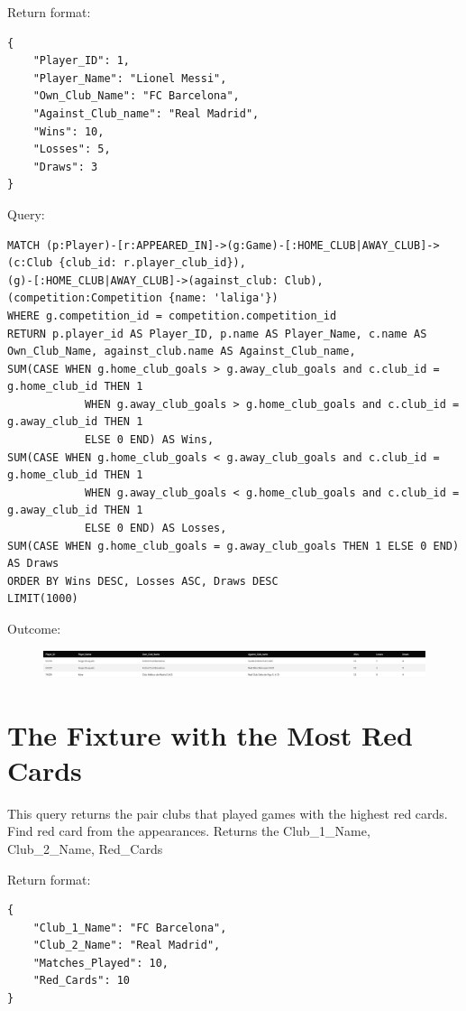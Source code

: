 \documentclass{Configuration_Files/PoliMi3i_thesis}
\begin{document}
Return format:
\begin{lstlisting}[style=json]
{
    "Player_ID": 1,
    "Player_Name": "Lionel Messi",
    "Own_Club_Name": "FC Barcelona",
    "Against_Club_name": "Real Madrid",
    "Wins": 10,
    "Losses": 5,
    "Draws": 3
}
\end{lstlisting}


Query:

\begin{lstlisting}[language=Cypher]
MATCH (p:Player)-[r:APPEARED_IN]->(g:Game)-[:HOME_CLUB|AWAY_CLUB]->(c:Club {club_id: r.player_club_id}),
(g)-[:HOME_CLUB|AWAY_CLUB]->(against_club: Club),
(competition:Competition {name: 'laliga'})
WHERE g.competition_id = competition.competition_id 
RETURN p.player_id AS Player_ID, p.name AS Player_Name, c.name AS Own_Club_Name, against_club.name AS Against_Club_name,
SUM(CASE WHEN g.home_club_goals > g.away_club_goals and c.club_id = g.home_club_id THEN 1
            WHEN g.away_club_goals > g.home_club_goals and c.club_id = g.away_club_id THEN 1
            ELSE 0 END) AS Wins,
SUM(CASE WHEN g.home_club_goals < g.away_club_goals and c.club_id = g.home_club_id THEN 1
            WHEN g.away_club_goals < g.home_club_goals and c.club_id = g.away_club_id THEN 1
            ELSE 0 END) AS Losses,
SUM(CASE WHEN g.home_club_goals = g.away_club_goals THEN 1 ELSE 0 END) AS Draws
ORDER BY Wins DESC, Losses ASC, Draws DESC
LIMIT(1000)
\end{lstlisting}


Outcome:
\begin{figure}[H]
    \centering
    \includegraphics[width=\linewidth]{Project Template/Images/query_output/q5.png}
\end{figure}











\section{The Fixture with the Most Red Cards}
This query returns the pair clubs that played games with the highest red cards. Find red card from the appearances.
Returns the Club\_1\_Name, Club\_2\_Name, Red\_Cards

Return format:
\begin{lstlisting}[style=json]
{
    "Club_1_Name": "FC Barcelona",
    "Club_2_Name": "Real Madrid",
    "Matches_Played": 10,
    "Red_Cards": 10
}
\end{lstlisting}
\end{document}
